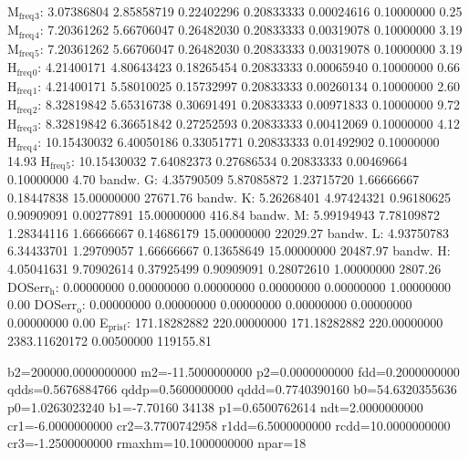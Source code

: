 \documentclass[11pt]{article}
\begin{document}
M\(_{\text{freq}}\)\(_{\text{3}}\):   3.07386804   2.85858719   0.22402296   0.20833333   0.00024616   0.10000000         0.25
M\(_{\text{freq}}\)\(_{\text{4}}\):   7.20361262   5.66706047   0.26482030   0.20833333   0.00319078   0.10000000         3.19
M\(_{\text{freq}}\)\(_{\text{5}}\):   7.20361262   5.66706047   0.26482030   0.20833333   0.00319078   0.10000000         3.19
H\(_{\text{freq}}\)\(_{\text{0}}\):   4.21400171   4.80643423   0.18265454   0.20833333   0.00065940   0.10000000         0.66
H\(_{\text{freq}}\)\(_{\text{1}}\):   4.21400171   5.58010025   0.15732997   0.20833333   0.00260134   0.10000000         2.60
H\(_{\text{freq}}\)\(_{\text{2}}\):   8.32819842   5.65316738   0.30691491   0.20833333   0.00971833   0.10000000         9.72
H\(_{\text{freq}}\)\(_{\text{3}}\):   8.32819842   6.36651842   0.27252593   0.20833333   0.00412069   0.10000000         4.12
H\(_{\text{freq}}\)\(_{\text{4}}\):  10.15430032   6.40050186   0.33051771   0.20833333   0.01492902   0.10000000        14.93
H\(_{\text{freq}}\)\(_{\text{5}}\):  10.15430032   7.64082373   0.27686534   0.20833333   0.00469664   0.10000000         4.70
bandw. G:   4.35790509   5.87085872   1.23715720   1.66666667   0.18447838  15.00000000     27671.76
bandw. K:   5.26268401   4.97424321   0.96180625   0.90909091   0.00277891  15.00000000       416.84
bandw. M:   5.99194943   7.78109872   1.28344116   1.66666667   0.14686179  15.00000000     22029.27
bandw. L:   4.93750783   6.34433701   1.29709057   1.66666667   0.13658649  15.00000000     20487.97
bandw. H:   4.05041631   9.70902614   0.37925499   0.90909091   0.28072610   1.00000000      2807.26
DOSerr\(_{\text{h}}\):   0.00000000   0.00000000   0.00000000   0.00000000   0.00000000   1.00000000         0.00
DOSerr\(_{\text{o}}\):   0.00000000   0.00000000   0.00000000   0.00000000   0.00000000   0.00000000         0.00
E\(_{\text{pris}}\)\(_{\text{f}}\): 171.18282882 220.00000000 171.18282882 220.00000000 2383.11620172   0.00500000    119155.81

  b2=200000.0000000000 m2=-11.5000000000 p2=0.0000000000 fdd=0.2000000000 qdds=0.5676884766 qddp=0.5600000000 qddd=0.7740390160 b0=54.6320355636 p0=1.0263023240 b1=-7.70160
34138 p1=0.6500762614 ndt=2.0000000000 cr1=-6.0000000000 cr2=3.7700742958 r1dd=6.5000000000 rcdd=10.0000000000 cr3=-1.2500000000 rmaxhm=10.1000000000 npar=18 
\end{document}
